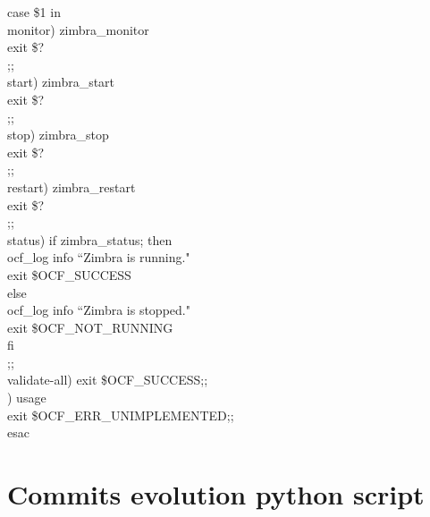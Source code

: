 \documentclass[a4paper, 12pt]{book}
\begin{document}
\noindent case \$1 in\\
    \indent monitor)    zimbra\_monitor\\
                \indent \indent exit \$?\\
                \indent \indent ;;\\
    \indent start)      zimbra\_start\\
                \indent \indent exit \$?\\
                \indent \indent ;;\\

    \indent stop)       zimbra\_stop\\
                \indent \indent exit \$?\\
                \indent \indent ;;\\

    \indent restart)     zimbra\_restart\\
                \indent \indent exit \$?\\
                \indent \indent ;;\\

    \indent status)     if zimbra\_status; then\\
                    \indent \indent \indent \indent ocf\_log info ``Zimbra is running."\\
                    \indent \indent \indent \indent exit \$OCF\_SUCCESS\\
                \indent \indent \indent else\\
                    \indent \indent \indent \indent ocf\_log info ``Zimbra is stopped."\\
                    \indent \indent \indent \indent exit \$OCF\_NOT\_RUNNING\\
                \indent \indent \indent fi\\
                \indent \indent \indent ;;\\

    \indent validate-all)   exit \$OCF\_SUCCESS;;\\

    \indent *)          usage\\
                \indent \indent exit \$OCF\_ERR\_UNIMPLEMENTED;;\\
esac


\chapter{Commits evolution python script}
\label{app:appendix2}
\end{document}
